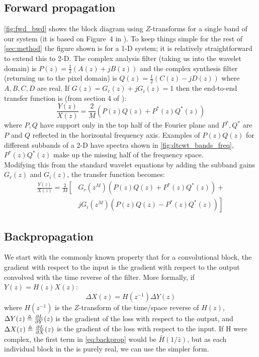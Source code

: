 \subsection{Forward propagation}
\autoref{fig:fwd_bwd} shows the block diagram using $Z$-transforms for a single band of our system (it
is based on Figure~4 in \cite{kingsbury_complex_2001}). To keep things simple for the rest of
\autoref{sec:method} the figure shown is for a 1-D system; 
it is relatively straightforward to extend this to 2-D\cite{selesnick_dual-tree_2005}. The complex
analysis filter (taking us into the wavelet domain) is $P(z) = \frac{1}{2}\left(A(z)+jB(z)\right)$ 
and the complex synthesis filter (returning us to the pixel domain) is 
$Q(z) = \frac{1}{2}\left(C(z) - jD(z)\right)$ 
where $A,B,C,D$ are real.  If $G(z) = G_r(z) + jG_i(z) = 1$ then the end-to-end transfer function is (from section 4 of
\cite{kingsbury_complex_2001}):
\begin{equation}\label{eq:end_to_end1}
\frac{Y(z)}{X(z)} = \frac{2}{M}\left(P(z)Q(z) + P^*(z)Q^*(z)\right)
\end{equation}
where $P, Q$ have support only in the top half of the Fourier plane and $P^*, Q^*$ are $P$ and $Q$ 
reflected in the horizontal frequency axis. Examples of $P(z)Q(z)$ for different subbands of a 2-D
\DTCWT have spectra shown in \autoref{fig:dtcwt_bands_freq}, $P^*(z)Q^*(z)$ make up the missing half
of the frequency space.\\
Modifying this from the standard wavelet equations by adding the subband gains $G_r(z)$ and
$G_i(z)$, the transfer function becomes:
\begin{equation}\label{eq:end_to_end2}
  \begin{split}
    \frac{Y(z)}{X(z)} = \frac{2}{M} \left[ \right. & G_r(z^M) \left( P(z)Q(z) + P^*(z)Q^*(z) \right) +  \\ 
     & \left. jG_i(z^M) \left(P(z)Q(z)-P^*(z)Q^*(z) \right) \right]
  \end{split}
\end{equation}

\subsection{Backpropagation}
We start with the commonly known property that for a convolutional block, the gradient with respect to the input is the gradient with
respect to the output convolved with the time reverse of the filter. More formally, if $Y(z) = H(z) X(z)$:
\begin{equation}\label{eq:backprop}
\Delta X(z) = H(z^{-1}) \Delta Y(z)
\end{equation}
where $H(z^{-1})$ is the $Z$-transform of the time/space reverse of $H(z)$, $\Delta Y(z)
\triangleq \frac{\partial L}{\partial Y}(z)$ is the gradient of the loss with respect to the output, and
$\Delta X(z) \triangleq \frac{\partial L}{\partial X}(z)$ is the gradient of the loss with respect to the input. If 
H were complex, the first term in \autoref{eq:backprop} would be $\bar{H}(1/\bar{z})$, but as each individual block
in the \DTCWT is purely real, we can use the simpler form. 

